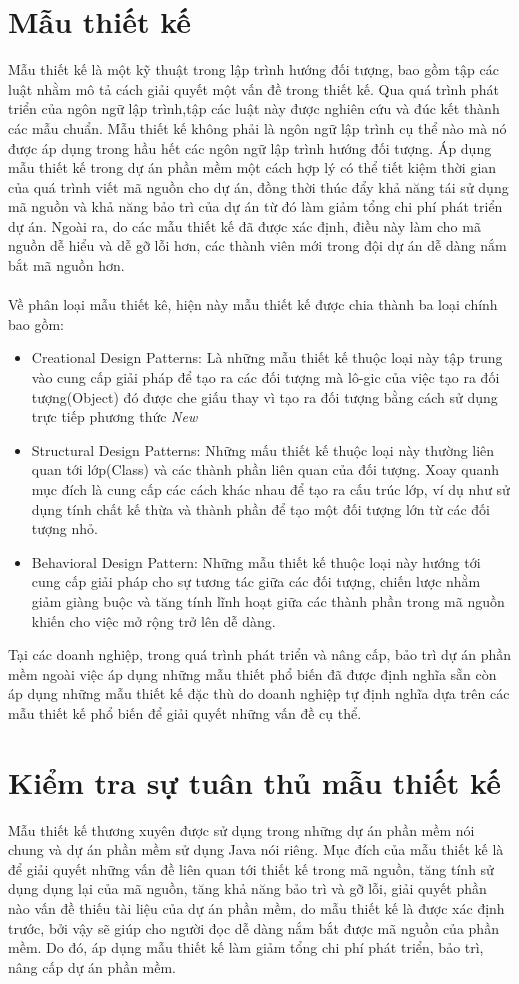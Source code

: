 \documentclass[12pt]{report}
\begin{document}
\section{Mẫu thiết kế}
Mẫu thiết kế là một kỹ thuật trong lập trình hướng đối tượng, bao gồm tập các luật nhằm mô tả cách giải quyết một vấn đề trong thiết kế. Qua quá trình phát triển của ngôn ngữ lập trình,tập các luật này được nghiên cứu và đúc kết thành các mẫu chuẩn. Mẫu thiết kế không phải là ngôn ngữ lập trình cụ thể nào mà nó được áp dụng trong hầu hết các ngôn ngữ lập trình hướng đối tượng.
Áp dụng mẫu thiết kế trong dự án phần mềm một cách hợp lý có thể tiết kiệm thời gian của quá trình viết mã nguồn cho dự án, đồng thời thúc đẩy khả năng tái sử dụng mã nguồn và khả năng bảo trì của dự án từ đó làm giảm tổng chi phí phát triển dự án. Ngoài ra, do các mẫu thiết kế đã được xác định, điều này làm cho mã nguồn dễ hiểu và dễ gỡ lỗi hơn, các thành viên mới trong đội dự án dễ dàng nắm bắt mã nguồn hơn.
 \\\\
Về phân loại mẫu thiết kê, hiện này mẫu thiết kế được chia thành ba loại chính bao gồm:
\begin{itemize}
	\item Creational Design Patterns: Là những mẫu thiết kế thuộc loại này tập trung vào cung cấp giải pháp để tạo ra các đối tượng mà lô-gic của việc tạo ra đối tượng(Object) đó được che giấu thay vì tạo ra đối tượng bằng cách sử dụng trực tiếp phương thức \textit{New}
	\item Structural Design Patterns: Những mấu thiết kế thuộc loại này thường liên quan tới lớp(Class) và các thành phần liên quan của đối tượng. Xoay quanh mục đích là cung cấp các cách khác nhau để tạo ra cấu trúc lớp, ví dụ như sử dụng tính chất kế thừa và thành phần để tạo một đối tượng lớn từ các đối tượng nhỏ.
	\item Behavioral Design Pattern: Những mẫu thiết kế thuộc loại này hướng tới cung cấp giải pháp cho sự tương tác giữa các đối tượng, chiến lược nhằm giảm giàng buộc và tăng tính lĩnh hoạt giữa các thành phần trong mã nguồn khiến cho việc mở rộng trở lên dễ dàng.
\end{itemize}
Tại các doanh nghiệp, trong quá trình phát triển và nâng cấp, bảo trì dự án phần mềm ngoài việc áp dụng những mẫu thiết phổ biến đã được định nghĩa sẵn còn áp dụng những mẫu thiết kế đặc thù do doanh nghiệp tự định nghĩa dựa trên các mẫu thiết kế phổ biến để giải quyết những vấn đề cụ thể.
\section{Kiểm tra sự tuân thủ mẫu thiết kế}
Mẫu thiết kế thương xuyên được sử dụng trong những dự án phần mềm nói chung và dự án phần mềm sử dụng Java nói riêng. Mục đích của mẫu thiết kế là để giải quyết những vấn đề liên quan tới thiết kế trong mã nguồn, tăng tính sử dụng dụng lại của mã nguồn, tăng khả năng bảo trì và gỡ lỗi, giải quyết phần nào vấn đề thiếu tài liệu của dự án phần mềm, do mẫu thiết kế là được xác định trước, bởi vậy sẽ giúp cho người đọc dễ dàng nắm bắt được mã nguồn của phần mềm. Do đó, áp dụng mẫu thiết kế làm giảm tổng chi phí phát triển, bảo trì, nâng cấp dự án phần mềm.
\end{document}

